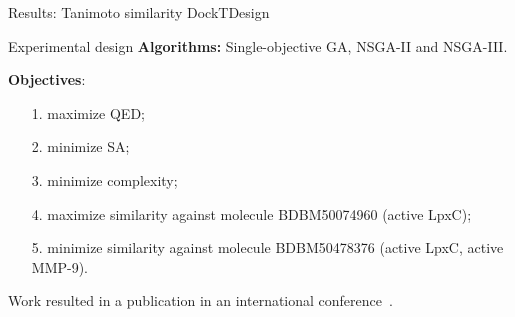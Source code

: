 \documentclass[aspectratio=169,xcolor=dvipsnames]{beamer}
\begin{document}
\begin{frame}{Results: Tanimoto similarity \hfill {\footnotesize \alert{DockTDesign}}}
    \begin{block}{Experimental design}
        \textbf{Algorithms:} Single-objective GA, NSGA-II and NSGA-III.

        \vspace{0.5em}

        \textbf{Objectives}:
        \begin{itemize}
            \item[1.] maximize QED;
            \item[2.] minimize SA;
            \item[3.] minimize complexity;
            \item[4.] maximize similarity against molecule BDBM50074960 (active LpxC);
            \item[5.] minimize similarity against molecule BDBM50478376 (active LpxC, active MMP-9).
        \end{itemize}
    \end{block}
    \small Work resulted in a publication in an international conference~\cite{da2024generative}.
\end{frame}




\end{document}
